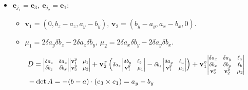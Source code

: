 \documentclass[12pt]{article}
\theoremstyle{definition}
\theoremstyle{remark}
\begin{document}
\begin{itemize}
    \item $\mathbf{e}_{j_1}=\mathbf{e}_3, \ \mathbf{e}_{j_2}=\mathbf{e}_1$: 
        \begin{itemize}
         \item[$\circ$] $\mathbf{v}_1 = (0, b_z-a_z, a_y-b_y),\, \mathbf{v}_2=(b_y-a_y, a_x-b_x, 0)$.
         \item[$\circ$] $\mu_1=2 \delta a_y \delta b_z-2 \delta a_z \delta b_y,\,  \mu_2=2 \delta a_x \delta b_y - 2 \delta a_y \delta b_x $.
        \end{itemize}
        \begin{align*}
        &D = \scalebox{0.78}{$\begin{vmatrix}
                    \delta a_z & \delta a_x \\
                    \delta b_z & \delta b_x
            \end{vmatrix}$} 
            \scalebox{0.78}{$\begin{vmatrix}
                    \mathbf{v}_1^y & \mu_1 \\
                    \mathbf{v}_2^y & \mu_2 
            \end{vmatrix}$}
            + \mathbf{v}_2^x \left( 
            \scalebox{0.78}{$ \delta a_z \begin{vmatrix}
                    \delta b_y & \ell_b \\
                    \mathbf{v}_1^y & \mu_1
            \end{vmatrix}$} -
            \scalebox{0.78}{$ \delta b_z \begin{vmatrix}
                    \delta a_y & \ell_a\\
                    \mathbf{v}_1^y & \mu_1
            \end{vmatrix}$}
            \right) +
            \mathbf{v}_1^z \scalebox{0.78}{$ \begin{vmatrix}
                    \delta a_x & \delta a_y & \ell_a\\
                    \delta b_x & \delta b_y & \ell_b\\
                    \mathbf{v}_2^x & \mathbf{v}_2^y & \mu_2
            \end{vmatrix}$} \\
        &-\det A = -(b-a)\cdot(e_3 \times e_1) = a_y - b_y
        \end{align*}
\end{itemize}
\end{document}
